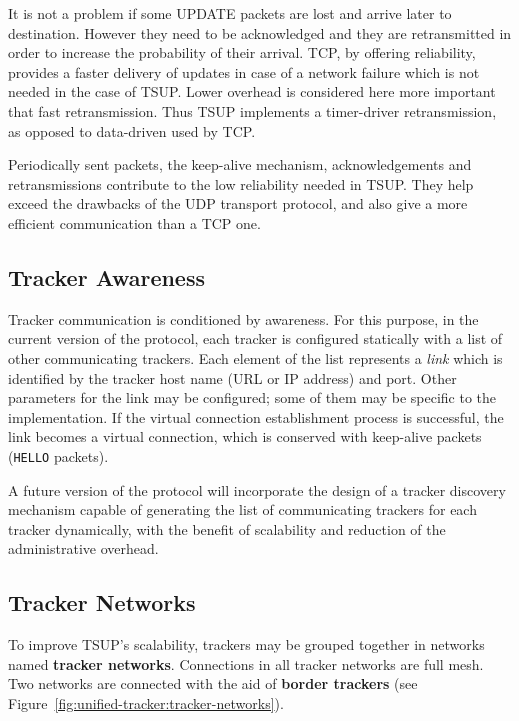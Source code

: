 It is not a problem if some UPDATE packets are lost and arrive later to
destination. However they need to be acknowledged and they are retransmitted
in order to increase the probability of their arrival. TCP, by offering
reliability, provides a faster delivery of updates in case of a network
failure which is not needed in the case of TSUP. Lower overhead is considered
here more important that fast retransmission. Thus TSUP implements a
timer-driver retransmission, as opposed to data-driven used by TCP.

Periodically sent packets, the keep-alive mechanism, acknowledgements and
retransmissions contribute to the low reliability needed in TSUP. They help
exceed the drawbacks of the UDP transport protocol, and also give a more
efficient communication than a TCP one.

\subsection{Tracker Awareness}
\label{subsec:unified-tracker:tracker-awareness}

Tracker communication is conditioned by awareness. For this purpose, in the
current version of the protocol, each tracker is configured statically with a
list of other communicating trackers. Each element of the list represents a
\textit{link} which is identified by the tracker host name (URL or IP address)
and port. Other parameters for the link may be configured; some of them may be
specific to the implementation. If the virtual connection establishment
process is successful, the link becomes a virtual connection, which is
conserved with keep-alive packets (\texttt{HELLO} packets).

A future version of the protocol will incorporate the design of a tracker
discovery mechanism capable of generating the list of communicating trackers
for each tracker dynamically, with the benefit of scalability and reduction of
the administrative overhead.

\subsection{Tracker Networks}
\label{subsec:unified-tracker:tracker-networks}

To improve TSUP's scalability, trackers may be grouped together in networks
named \textbf{tracker networks}. Connections in all tracker networks are full
mesh. Two networks are connected with the aid of \textbf{border trackers} (see
Figure~\ref{fig:unified-tracker:tracker-networks}).

